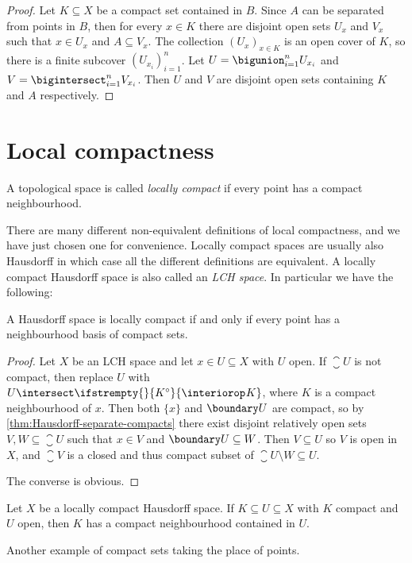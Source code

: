 \documentclass[article, a4paper, 11pt, oneside]{memoir}
\numberwithin{equation}{chapter}
\renewcommand\interior[2][]{%
    \ifstrempty{#1}{%
        #2^{\circ}
    }{%
        \interiorop_{#1}#2
    }%
}
\begin{document}
\begin{proof}
    Let $K \subseteq X$ be a compact set contained in $B$. Since $A$ can be separated from points in $B$, then for every $x \in K$ there are disjoint open sets $U_x$ and $V_x$ such that $x \in U_x$ and $A \subseteq V_x$. The collection $(U_x)_{x \in K}$ is an open cover of $K$, so there is a finite subcover $(U_{x_i})_{i=1}^n$. Let $U = \bigunion_{i=1}^n U_{x_i}$ and $V = \bigintersect_{i=1}^n V_{x_i}$. Then $U$ and $V$ are disjoint open sets containing $K$ and $A$ respectively.
\end{proof}


\section{Local compactness}

\begin{definition}
    A topological space is called \emph{locally compact} if every point has a compact neighbourhood.
\end{definition}
%
There are many different non-equivalent definitions of local compactness, and we have just chosen one for convenience. Locally compact spaces are usually also Hausdorff in which case all the different definitions are equivalent. A locally compact Hausdorff space is also called an \emph{LCH space}. In particular we have the following:

\begin{proposition}
    \label{thm:LCH-equivalent-condition}
    A Hausdorff space is locally compact if and only if every point has a neighbourhood basis of compact sets.
\end{proposition}

\begin{proof}
    Let $X$ be an LCH space and let $x \in U \subseteq X$ with $U$ open. If $\closure{U}$ is not compact, then replace $U$ with $U \intersect \interior{K}$, where $K$ is a compact neighbourhood of $x$. Then both $\{x\}$ and $\boundary U$ are compact, so by \cref{thm:Hausdorff-separate-compacts} there exist disjoint relatively open sets $V, W \subseteq \closure{U}$ such that $x \in V$ and $\boundary U \subseteq W$. Then $V \subseteq U$ so $V$ is open in $X$, and $\closure{V}$ is a closed and thus compact subset of $\closure{U} \setminus W \subseteq U$.

    The converse is obvious.
\end{proof}


\begin{corollary}
    \label{thm:LCH-compact-set-has-compact-nhood}
    Let $X$ be a locally compact Hausdorff space. If $K \subseteq U \subseteq X$ with $K$ compact and $U$ open, then $K$ has a compact neighbourhood contained in $U$.
\end{corollary}
%
Another example of compact sets taking the place of points.
\end{document}
